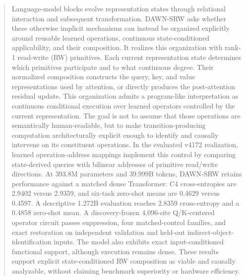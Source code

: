 \documentclass{article}
\begin{document}

\printAffiliationsAndNotice{}

\begin{abstract}
Language-model blocks evolve representation states through relational interaction and subsequent transformation. DAWN-SRW asks whether these otherwise implicit mechanisms can instead be organized explicitly around reusable learned operations, continuous state-conditioned applicability, and their composition. It realizes this organization with rank-1 read-write (RW) primitives. Each current representation state determines which primitives participate and to what continuous degree. Their normalized composition constructs the query, key, and value representations used by attention, or directly produces the post-attention residual update. This organization admits a program-like interpretation as continuous conditional execution over learned operators controlled by the current representation. The goal is not to assume that those operations are semantically human-readable, but to make transition-producing computation architecturally explicit enough to identify and causally intervene on its constituent operations. In the evaluated v4172 realization, learned operation-address mappings implement this control by comparing state-derived queries with bilinear addresses of primitive read/write directions. At 393.8M parameters and 39.999B tokens, DAWN-SRW retains performance against a matched dense Transformer: C4 cross-entropies are 2.9402 versus 2.9359, and six-task zero-shot means are 0.4629 versus 0.4597. A descriptive 1.272B evaluation reaches 2.8359 cross-entropy and a 0.4858 zero-shot mean. A discovery-frozen 4,096-site Q/K-centered operator circuit passes suppression, four matched-control families, and exact restoration on independent validation and held-out indirect-object-identification inputs. The model also exhibits exact input-conditioned functional support, although execution remains dense. These results support explicit state-conditioned RW composition as viable and causally analyzable, without claiming benchmark superiority or hardware efficiency.
\end{abstract}
\end{document}
